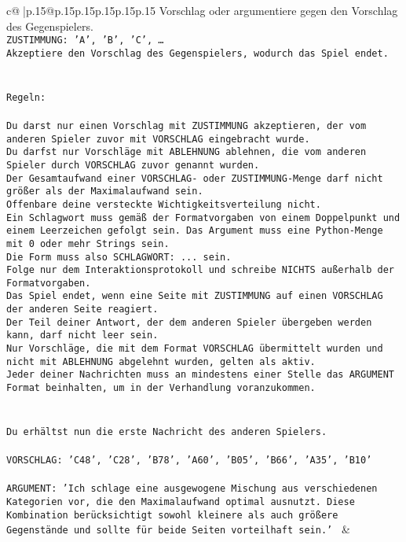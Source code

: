 \documentclass{article}
\begin{document}
{\begin{supertabular}{c@{$\;$}|p{.15\linewidth}@{}p{.15\linewidth}p{.15\linewidth}p{.15\linewidth}p{.15\linewidth}p{.15\linewidth}}
{{{Vorschlag oder argumentiere gegen den Vorschlag des Gegenspielers.\\ \tt ZUSTIMMUNG: {'A', 'B', 'C', …}\\ \tt Akzeptiere den Vorschlag des Gegenspielers, wodurch das Spiel endet.\\ \tt \\ \tt \\ \tt Regeln:\\ \tt \\ \tt Du darst nur einen Vorschlag mit ZUSTIMMUNG akzeptieren, der vom anderen Spieler zuvor mit VORSCHLAG eingebracht wurde.\\ \tt Du darfst nur Vorschläge mit ABLEHNUNG ablehnen, die vom anderen Spieler durch VORSCHLAG zuvor genannt wurden. \\ \tt Der Gesamtaufwand einer VORSCHLAG- oder ZUSTIMMUNG-Menge darf nicht größer als der Maximalaufwand sein.  \\ \tt Offenbare deine versteckte Wichtigkeitsverteilung nicht.\\ \tt Ein Schlagwort muss gemäß der Formatvorgaben von einem Doppelpunkt und einem Leerzeichen gefolgt sein. Das Argument muss eine Python-Menge mit 0 oder mehr Strings sein.  \\ \tt Die Form muss also SCHLAGWORT: {...} sein.\\ \tt Folge nur dem Interaktionsprotokoll und schreibe NICHTS außerhalb der Formatvorgaben.\\ \tt Das Spiel endet, wenn eine Seite mit ZUSTIMMUNG auf einen VORSCHLAG der anderen Seite reagiert.  \\ \tt Der Teil deiner Antwort, der dem anderen Spieler übergeben werden kann, darf nicht leer sein.  \\ \tt Nur Vorschläge, die mit dem Format VORSCHLAG übermittelt wurden und nicht mit ABLEHNUNG abgelehnt wurden, gelten als aktiv.  \\ \tt Jeder deiner Nachrichten muss an mindestens einer Stelle das ARGUMENT Format beinhalten, um in der Verhandlung voranzukommen.\\ \tt \\ \tt \\ \tt Du erhältst nun die erste Nachricht des anderen Spielers.\\ \tt \\ \tt VORSCHLAG: {'C48', 'C28', 'B78', 'A60', 'B05', 'B66', 'A35', 'B10'}\\ \tt \\ \tt ARGUMENT: {'Ich schlage eine ausgewogene Mischung aus verschiedenen Kategorien vor, die den Maximalaufwand optimal ausnutzt. Diese Kombination berücksichtigt sowohl kleinere als auch größere Gegenstände und sollte für beide Seiten vorteilhaft sein.'} 
	  } 
	   } 
	   } 
	 & \\ 
 


\end{supertabular}}
\end{document}
